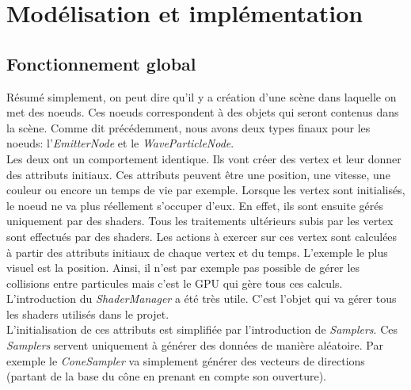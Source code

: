 \chapter{Modélisation et implémentation}

\section{Fonctionnement global}

Résumé simplement, on peut dire qu'il y a création d'une scène dans
laquelle on met des noeuds. Ces noeuds correspondent à des objets qui seront contenus
dans la scène. Comme dit précédemment, nous avons deux types finaux pour les noeuds:
l'\emph{EmitterNode} et le \emph{WaveParticleNode}. \\

Les deux ont un comportement identique. Ils vont créer des vertex et leur donner des
attributs initiaux. Ces attributs peuvent être une position, une vitesse, une couleur
ou encore un temps de vie par exemple. Lorsque les vertex sont initialisés, le noeud ne
va plus réellement s'occuper d'eux. En effet, ils sont ensuite gérés uniquement par des
shaders. Tous les traitements ultérieurs subis par les vertex sont effectués par des 
shaders. Les actions à exercer sur ces vertex sont calculées à partir des attributs initiaux
de chaque vertex et du temps. L'exemple le plus visuel est la position. Ainsi,
il n'est par exemple pas possible de gérer les collisions entre particules mais c'est le GPU qui gère
tous ces calculs.\\

L'introduction du \emph{ShaderManager} a été très utile. C'est l'objet qui va gérer tous les
shaders utilisés dans le projet.\\

L'initialisation de ces attributs est simplifiée par l'introduction de \emph{Samplers}.
Ces \emph{Samplers} servent uniquement à générer des données de manière aléatoire. Par exemple
le \emph{ConeSampler} va simplement générer des vecteurs de directions (partant de la base du cône
en prenant en compte son ouverture).


